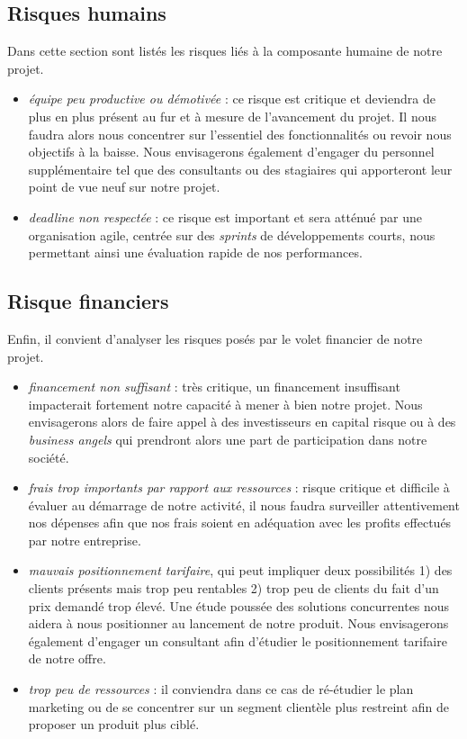 \documentclass[10pt,twocolumn,a4paper,utf8x]{article}
\begin{document}
\subsection{Risques humains}

Dans cette section sont listés les risques liés à la composante humaine
de notre projet.

\begin{itemize}
\itemsep1pt\parskip0pt
\item
  \emph{équipe peu productive ou démotivée} : ce risque est critique et
  deviendra de plus en plus présent au fur et à mesure de l'avancement
  du projet. Il nous faudra alors nous concentrer sur l'essentiel des
  fonctionnalités ou revoir nous objectifs à la baisse. Nous
  envisagerons également d'engager du personnel supplémentaire tel que
  des consultants ou des stagiaires qui apporteront leur point de vue
  neuf sur notre projet.
\item
  \emph{deadline non respectée} : ce risque est important et sera
  atténué par une organisation agile, centrée sur des \emph{sprints} de
  développements courts, nous permettant ainsi une évaluation rapide de
  nos performances.
\end{itemize}

\subsection{Risque financiers}

Enfin, il convient d'analyser les risques posés par le volet financier
de notre projet.

\begin{itemize}
\itemsep1pt\parskip0pt
\item
  \emph{financement non suffisant} : très critique, un financement
  insuffisant impacterait fortement notre capacité à mener à bien notre
  projet. Nous envisagerons alors de faire appel à des investisseurs en
  capital risque ou à des \emph{business angels} qui prendront alors une
  part de participation dans notre société.
\item
  \emph{frais trop importants par rapport aux ressources} : risque
  critique et difficile à évaluer au démarrage de notre activité, il
  nous faudra surveiller attentivement nos dépenses afin que nos frais
  soient en adéquation avec les profits effectués par notre entreprise.
\item
  \emph{mauvais positionnement tarifaire}, qui peut impliquer deux
  possibilités 1) des clients présents mais trop peu rentables 2) trop
  peu de clients du fait d'un prix demandé trop élevé. Une étude poussée
  des solutions concurrentes nous aidera à nous positionner au lancement
  de notre produit. Nous envisagerons également d'engager un consultant
  afin d'étudier le positionnement tarifaire de notre offre.
\item
  \emph{trop peu de ressources} : il conviendra dans ce cas de
  ré-étudier le plan marketing ou de se concentrer sur un segment
  clientèle plus restreint afin de proposer un produit plus ciblé.
\end{itemize}
\end{document}
